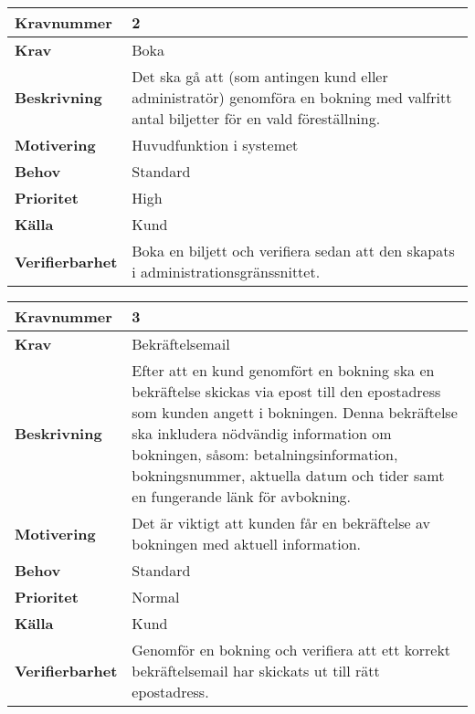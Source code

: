 \documentclass[a4paper, twoside, 11pt, titlepage]{article}
\begin{document}
\begin{tabular} { | p{3cm} | p{12.2cm} | }
	\hline
	\textbf{Kravnummer} & 2  \\
	\hline
	\textbf{Krav} & Boka  \\
	\hline
	\textbf{Beskrivning} & Det ska gå att (som antingen kund eller administratör) genomföra en bokning med valfritt antal biljetter för en vald föreställning.  \\
	\hline
	\textbf{Motivering} & Huvudfunktion i systemet  \\
	\hline
	\textbf{Behov} & Standard  \\
	\hline
	\textbf{Prioritet} & High  \\
	\hline
	\textbf{Källa} & Kund  \\
	\hline
	\textbf{Verifierbarhet} & Boka en biljett och verifiera sedan att den skapats i administrationsgränssnittet.  \\
	\hline
\end{tabular}

\begin{tabular} { | p{3cm} | p{12.2cm} | }
	\hline
	\textbf{Kravnummer} & 3  \\
	\hline
	\textbf{Krav} & Bekräftelsemail  \\
	\hline
	\textbf{Beskrivning} & Efter att en kund genomfört en bokning ska en bekräftelse skickas via epost till den epostadress som kunden angett i bokningen. Denna bekräftelse ska inkludera nödvändig information om bokningen, såsom: betalningsinformation, bokningsnummer, aktuella datum och tider samt en fungerande länk för avbokning.  \\
	\hline
	\textbf{Motivering} & Det är viktigt att kunden får en bekräftelse av bokningen med aktuell information.  \\
	\hline
	\textbf{Behov} & Standard  \\
	\hline
	\textbf{Prioritet} & Normal  \\
	\hline
	\textbf{Källa} & Kund  \\
	\hline
	\textbf{Verifierbarhet} & Genomför en bokning och verifiera att ett korrekt bekräftelsemail har skickats ut till rätt epostadress.  \\
	\hline
\end{tabular}
\end{document}

